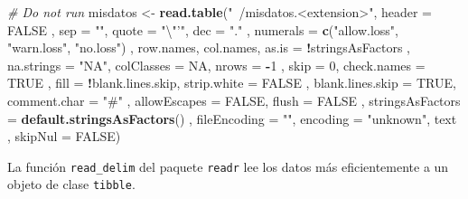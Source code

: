 \documentclass[]{article}
\newenvironment{Shaded}{\begin{snugshade}}{\end{snugshade}}
\newcommand{\KeywordTok}[1]{\textcolor[rgb]{0.13,0.29,0.53}{\textbf{#1}}}
\newcommand{\DataTypeTok}[1]{\textcolor[rgb]{0.13,0.29,0.53}{#1}}
\newcommand{\DecValTok}[1]{\textcolor[rgb]{0.00,0.00,0.81}{#1}}
\newcommand{\CharTok}[1]{\textcolor[rgb]{0.31,0.60,0.02}{#1}}
\newcommand{\StringTok}[1]{\textcolor[rgb]{0.31,0.60,0.02}{#1}}
\newcommand{\CommentTok}[1]{\textcolor[rgb]{0.56,0.35,0.01}{\textit{#1}}}
\newcommand{\OtherTok}[1]{\textcolor[rgb]{0.56,0.35,0.01}{#1}}
\newcommand{\OperatorTok}[1]{\textcolor[rgb]{0.81,0.36,0.00}{\textbf{#1}}}
\newcommand{\NormalTok}[1]{#1}
\begin{document}
\begin{Shaded}
\begin{Highlighting}[]
\CommentTok{# Do not run}
\NormalTok{misdatos <-}\StringTok{ }\KeywordTok{read.table}\NormalTok{(}\StringTok{"~/misdatos.<extension>"}\NormalTok{, }\DataTypeTok{header =} \OtherTok{FALSE}
\NormalTok{                       , }\DataTypeTok{sep =} \StringTok{""}\NormalTok{, }\DataTypeTok{quote =} \StringTok{"}\CharTok{\textbackslash{}"}\StringTok{'"}\NormalTok{, }\DataTypeTok{dec =} \StringTok{"."}
\NormalTok{                       , }\DataTypeTok{numerals =} \KeywordTok{c}\NormalTok{(}\StringTok{"allow.loss"}\NormalTok{, }\StringTok{"warn.loss"}\NormalTok{, }\StringTok{"no.loss"}\NormalTok{)}
\NormalTok{                       , row.names, col.names, }\DataTypeTok{as.is =} \OperatorTok{!}\NormalTok{stringsAsFactors}
\NormalTok{                       , }\DataTypeTok{na.strings =} \StringTok{"NA"}\NormalTok{, }\DataTypeTok{colClasses =} \OtherTok{NA}\NormalTok{, }\DataTypeTok{nrows =} \OperatorTok{-}\DecValTok{1}
\NormalTok{                       , }\DataTypeTok{skip =} \DecValTok{0}\NormalTok{, }\DataTypeTok{check.names =} \OtherTok{TRUE}
\NormalTok{                       , }\DataTypeTok{fill =} \OperatorTok{!}\NormalTok{blank.lines.skip, }\DataTypeTok{strip.white =} \OtherTok{FALSE}
\NormalTok{                       , }\DataTypeTok{blank.lines.skip =} \OtherTok{TRUE}\NormalTok{, }\DataTypeTok{comment.char =} \StringTok{"#"}
\NormalTok{                       , }\DataTypeTok{allowEscapes =} \OtherTok{FALSE}\NormalTok{, }\DataTypeTok{flush =} \OtherTok{FALSE}
\NormalTok{                       , }\DataTypeTok{stringsAsFactors =} \KeywordTok{default.stringsAsFactors}\NormalTok{()}
\NormalTok{                       , }\DataTypeTok{fileEncoding =} \StringTok{""}\NormalTok{, }\DataTypeTok{encoding =} \StringTok{"unknown"}\NormalTok{, text}
\NormalTok{                       , }\DataTypeTok{skipNul =} \OtherTok{FALSE}\NormalTok{)}
\end{Highlighting}
\end{Shaded}

La función \texttt{read\_delim} del paquete \texttt{readr}
\parencite{readr} lee los datos más eficientemente a un objeto de clase
\texttt{tibble}.
\end{document}
